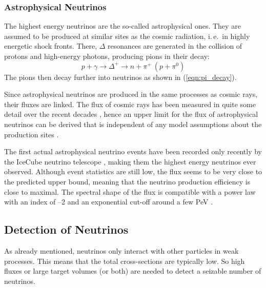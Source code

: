 
\subsubsection{Astrophysical Neutrinos}

The highest energy neutrinos are the so-called astrophysical ones. They are  
assumed to be produced at similar sites as the cosmic radiation, i.\,e.\ in 
highly energetic shock fronts. There, $\Delta$ resonances are generated in the 
collision of protons and high-energy photons, producing pions in their decay:
\begin{equation}
 p + \gamma \to \Delta^+ \to n + \pi^+\ (p + \pi^0)
\end{equation}
The pions then decay further into neutrinos as shown in (\ref{eqn:pi_decay}).

Since astrophysical neutrinos are produced in the same processes as cosmic 
rays, their fluxes are linked. The flux of cosmic rays has been measured in 
quite some detail over the recent decades \cite{CosmRaySpec}, hence an upper 
limit for the flux of astrophysical neutrinos can be derived that is 
independent of any model assumptions about the production sites \cite{WB_bound}.

The first actual astrophysical neutrino events have been recorded only recently 
by the IceCube neutrino telescope \cite{HESE, HESE_3yr}, making them the 
highest energy neutrinos ever observed. Although event statistics are still 
low, the flux seems to be very close to the predicted upper bound, meaning that 
the neutrino production efficiency is close to maximal. The spectral shape of 
the flux is compatible with a power law with an index of --2 and an exponential 
cut-off around a few PeV \cite{Lars_globalfit}.

\subsection{Detection of Neutrinos}

As already mentioned, neutrinos only interact with other particles in weak
processes. This means that the total cross-sections are typically low. So high
fluxes or large target volumes (or both) are needed to detect a seizable
number of neutrinos.

